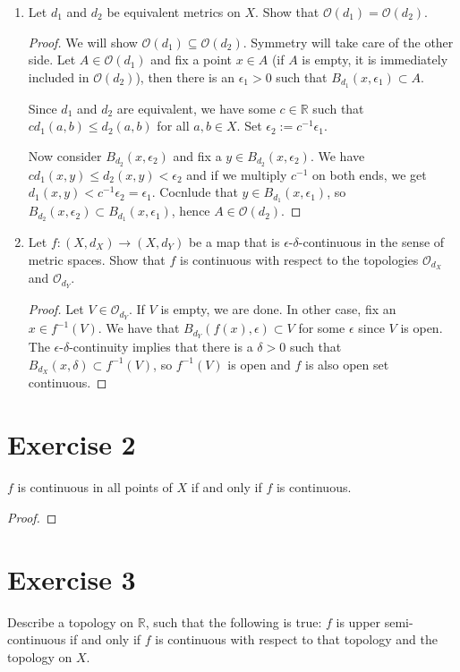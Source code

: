 \documentclass[a4paper]{article}
\begin{document}
\begin{enumerate}
    \item Let \(d_1\) and \(d_2\) be equivalent metrics on \(X\). Show that \(\mathcal{O}(d_1) = \mathcal{O}(d_2)\).

    \begin{proof}
        We will show \(\mathcal{O}(d_1) \subseteq \mathcal{O}(d_2)\). Symmetry will take care of the other side. Let \(A \in \mathcal{O}(d_1)\) and fix a point \(x \in A\) (if \(A\) is empty, it is immediately included in \(\mathcal{O}(d_2)\)), then there is an \(\epsilon_1 > 0\) such that \(B_{d_1}(x, \epsilon_1) \subset A\).

        Since \(d_1\) and \(d_2\) are equivalent, we have some \(c \in \mathbb{R}\) such that \(c d_1(a, b) \leq d_2(a, b)\) for all \(a, b \in X\). Set \(\epsilon_2 := c^{-1} \epsilon_1\).

        Now consider \(B_{d_2}(x, \epsilon_2)\) and fix a \(y \in B_{d_2}(x, \epsilon_2)\). We have \(c d_1(x, y) \leq d_2(x, y) < \epsilon_2\) and if we multiply \(c^{-1}\) on both ends, we get \(d_1(x, y) < c^{-1} \epsilon_2 = \epsilon_1\). Cocnlude that \(y \in B_{d_1}(x, \epsilon_1)\), so \(B_{d_2}(x, \epsilon_2) \subset B_{d_1}(x, \epsilon_1)\), hence \(A \in \mathcal{O}(d_2)\).
    \end{proof}

    \item Let \(f: (X, d_X) \longrightarrow (X, d_Y)\) be a map that is \(\epsilon\)-\(\delta\)-continuous in the sense of metric spaces. Show that \(f\) is continuous with respect to the topologies \(\mathcal{O}_{d_X}\) and \(\mathcal{O}_{d_Y}\).
    
    \begin{proof}
        Let \(V \in \mathcal{O}_{d_Y}\). If \(V\) is empty, we are done. In other case, fix an \(x \in f^{-1}(V)\). We have that \(B_{d_Y}(f(x), \epsilon) \subset V\) for some \(\epsilon\) since \(V\) is open. The \(\epsilon\)-\(\delta\)-continuity implies that there is a \(\delta > 0\) such that \(B_{d_X}(x, \delta) \subset f^{-1}(V)\), so \(f^{-1}(V)\) is open and \(f\) is also open set continuous. 
    \end{proof}

\end{enumerate}

\section*{Exercise 2}
\(f\) is continuous in all points of \(X\) if and only if \(f\) is continuous.

\begin{proof}
    
\end{proof}

\section*{Exercise 3}
    Describe a topology on \(\mathbb{R}\), such that the following is true: \(f\) is upper semi-continuous if and only if \(f\) is continuous with respect to that topology and the topology on \(X\).
\end{document}
